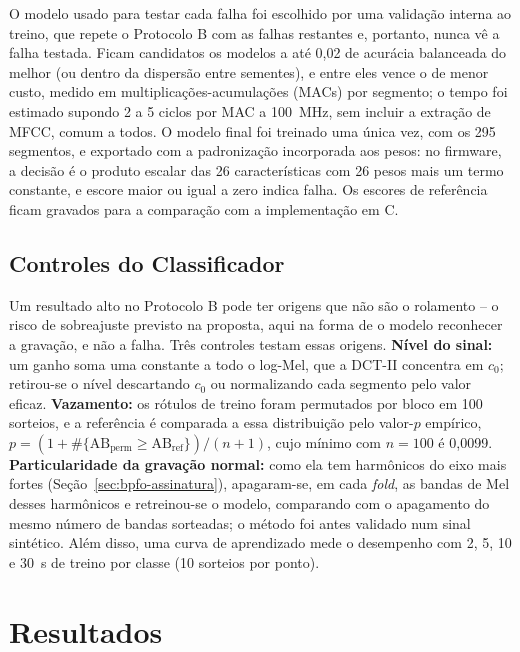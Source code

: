 \documentclass[12pt,a4paper]{article}
\begin{document}
O modelo usado para testar cada falha foi escolhido por uma validação interna ao treino, que repete o Protocolo B com as falhas restantes e, portanto, nunca vê a falha testada. Ficam candidatos os modelos a até 0,02 de acurácia balanceada do melhor (ou dentro da dispersão entre sementes), e entre eles vence o de menor custo, medido em multiplicações-acumulações (MACs) por segmento; o tempo foi estimado supondo 2 a 5 ciclos por MAC a 100~MHz, sem incluir a extração de MFCC, comum a todos. O modelo final foi treinado uma única vez, com os 295 segmentos, e exportado com a padronização incorporada aos pesos: no firmware, a decisão é o produto escalar das 26 características com 26 pesos mais um termo constante, e escore maior ou igual a zero indica falha. Os escores de referência ficam gravados para a comparação com a implementação em C.

\subsection{Controles do Classificador}
\label{sec:controles}

Um resultado alto no Protocolo B pode ter origens que não são o rolamento -- o risco de sobreajuste previsto na proposta, aqui na forma de o modelo reconhecer a gravação, e não a falha. Três controles testam essas origens. \textbf{Nível do sinal:} um ganho soma uma constante a todo o log-Mel, que a DCT-II concentra em $c_0$; retirou-se o nível descartando $c_0$ ou normalizando cada segmento pelo valor eficaz. \textbf{Vazamento:} os rótulos de treino foram permutados por bloco em 100 sorteios, e a referência é comparada a essa distribuição pelo valor-$p$ empírico, $p = (1 + \#\{\mathrm{AB}_{\text{perm}} \ge \mathrm{AB}_{\text{ref}}\})/(n+1)$, cujo mínimo com $n = 100$ é 0,0099. \textbf{Particularidade da gravação normal:} como ela tem harmônicos do eixo mais fortes (Seção~\ref{sec:bpfo-assinatura}), apagaram-se, em cada \emph{fold}, as bandas de Mel desses harmônicos e retreinou-se o modelo, comparando com o apagamento do mesmo número de bandas sorteadas; o método foi antes validado num sinal sintético. Além disso, uma curva de aprendizado mede o desempenho com 2, 5, 10 e 30~s de treino por classe (10 sorteios por ponto).

\section{Resultados}
\label{sec:resultados}
\end{document}
